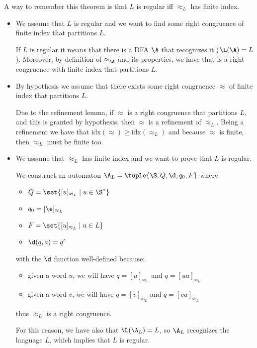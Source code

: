 \documentclass[oneside]{academica}
\begin{document}
A way to remember this theorem is that $L$ is regular iff $\approx_L$ has finite index.

\newpage

\begin{proof*}
  \begin{itemize}
    \item[\color{pink!200}$1 \Rightarrow 2$] We assume that $L$ is regular and we want to find some right congruence of finite index that partitions $L$.

      If $L$ is regular it means that there is a DFA $\A$ that recognizes it ($\L(\A) = L$).
      Moreover, by definition of  $\approx_{\A}$ and its properties, we have that is a right congruence with finite index that partitions $L$.
    \item[\color{pink!200}$2 \Rightarrow 3$] By hypothesis we assume that there exists some right congruence $\approx$ of finite index that partitions $L$.

      Due to the refinement lemma, if $\approx$ is a right congruence that partitions $L$, and this is granted by hypothesis, then $\approx$ is a refinement of $\approx_L$.
      Being a refinement we have that $\text{idx}(\approx) \ge \text{idx}(\approx_L)$ and because $\approx$ is finite, then $\approx_L$ must be finite too.
    \item[\color{pink!200}$3 \Rightarrow 1$] We assume that $\approx_L$ has finite index and we want to prove that $L$ is regular.

      We construct an automaton $\A_L = \tuple{\S, Q, \d, q_0, F}$ where
      \begin{itemize}
        \item $Q = \set{[u]_{\approx_L} \mid u \in \S^*}$
        \item $q_0 = [\e]_{\approx_L}$
        \item $F = \set{[u]_{\approx_L} \mid u \in L}$
        \item $\d(q,a) = q'$
      \end{itemize}
      with the $\d$ function well-defined because:
      \begin{itemize}
        \item given a word $u$, we will have $q = [u]_{\approx_L}$ and $q = [ua]_{\approx_L}$
        \item given a word $v$, we will have $q = [v]_{\approx_L}$ and $q = [va]_{\approx_L}$
      \end{itemize}
      thus $\approx_L$ is a right congruence.

      For this reason, we have also that $\L(\A_L) = L$, so $\A_L$ recognizes the language $L$, which implies that $L$ is regular.
  \end{itemize}
\end{proof*}
\end{document}
